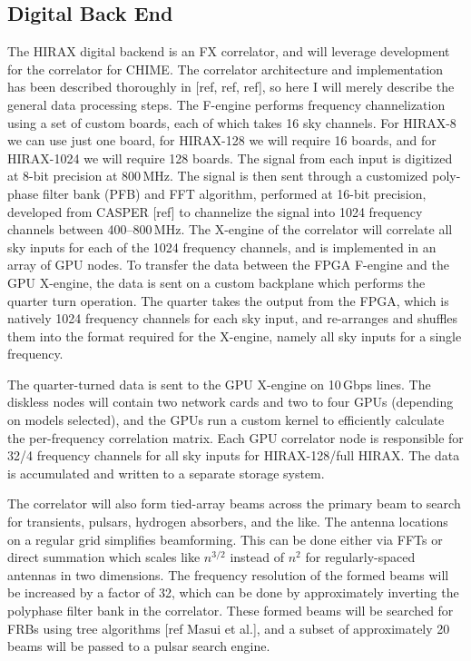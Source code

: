 \documentclass[]{spie}  %
\begin{document}
\subsection{Digital Back End}

The HIRAX digital backend is an FX correlator, and will leverage development for the correlator for CHIME. The correlator architecture and implementation has been described thoroughly in [ref, ref, ref], so here I will merely describe the general data processing steps. The F-engine performs frequency channelization using a set of custom boards, each of which takes 16 sky channels. For HIRAX-8 we can use just one board, for HIRAX-128 we will require 16 boards, and for HIRAX-1024 we will require 128 boards. The signal from each input is digitized at 8-bit precision at 800\,MHz. The signal is then sent through a customized poly-phase filter bank (PFB) and FFT algorithm, performed at 16-bit precision, developed from CASPER [ref] to channelize the signal into 1024 frequency channels between 400--800\,MHz. The X-engine of the correlator will correlate all sky inputs for each of the 1024 frequency channels, and is implemented in an array of GPU nodes. To transfer the data between the FPGA F-engine and the GPU X-engine, the data is sent on a custom backplane which performs the quarter turn operation. The quarter takes the output from the FPGA, which is natively 1024 frequency channels for each sky input, and re-arranges and shuffles them into the format required for the X-engine, namely all sky inputs for a single frequency. \newline

The quarter-turned data is sent to the GPU X-engine on 10\,Gbps lines. The diskless nodes will contain two network cards and two to four GPUs (depending on models selected), and the GPUs run a custom kernel to efficiently calculate the per-frequency correlation matrix. Each GPU correlator node is responsible for 32/4 frequency channels for all sky inputs for HIRAX-128/full HIRAX. The data is accumulated and written to a separate storage system. \newline

The correlator will also form tied-array beams across the primary beam to search for transients, pulsars, hydrogen absorbers, and the like.  The antenna locations on a regular grid simplifies beamforming.  This can be done either via FFTs or direct summation which scales like $n^{3/2}$ instead of $n^2$ for regularly-spaced antennas in two dimensions.  The frequency resolution of the formed beams will be increased by a factor of 32, which can be done by approximately inverting the polyphase filter bank in the correlator.  These formed beams will be searched for FRBs using tree algorithms [ref Masui et al.], and a subset of approximately 20 beams will be passed to a pulsar search engine.
\end{document}
